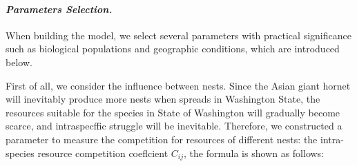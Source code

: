 \documentclass[../mcmpaper]{subfiles}
\begin{document}
    \paragraph{\itshape Parameters Selection.}
    When building the model, we select several parameters with practical significance such as biological populations and geographic conditions, which are introduced below.
    \par
    First of all, we consider the inﬂuence between nests. Since the Asian giant hornet will inevitably produce more nests when spreads in Washington State, the resources suitable for the species in State of Washington will gradually become scarce, and intraspecffic struggle will be inevitable. Therefore, we constructed a parameter to measure the competition for resources of diﬀerent nests: the intra-species resource competition coeflcient $C_{ij}$, the formula is shown as follows:
    
\end{document}

